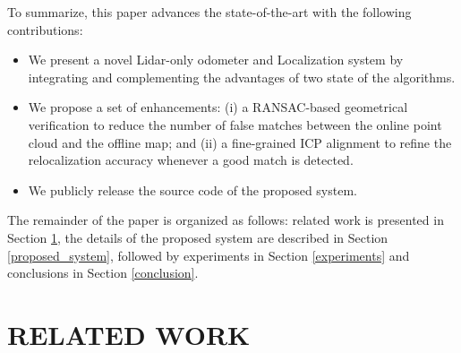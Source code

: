 \documentclass[letterpaper, 10 pt, conference]{ieeeconf}  %
\begin{document}
To summarize, this paper advances the state-of-the-art with the following contributions:
\begin{itemize}
    \item We present a novel Lidar-only odometer and Localization system by integrating and complementing the advantages of two state of the algorithms. 
    \item We propose a set of enhancements: (i) a RANSAC-based geometrical verification to reduce the number of false  
    matches between the online point cloud and the offline map; and (ii) a fine-grained ICP alignment to refine the relocalization accuracy whenever a good match is detected.
    \item We publicly release the source code of the proposed system.


\end{itemize}{}

The remainder of the paper is organized as follows: related work is presented in Section \ref{related}, the details of the proposed system are described in Section \ref{proposed_system}, followed by experiments in Section \ref{experiments} and conclusions in Section \ref{conclusion}.

\section{RELATED WORK} \label{related}
\end{document}
